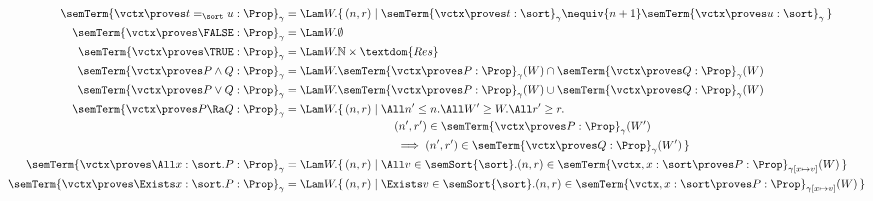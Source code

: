\begin{align*}
	\semTerm{\vctx \proves t =_\sort u : \Prop}_\gamma &=
	\Lam W. \{\, (n, r) \mid \semTerm{\vctx \proves t : \sort}_\gamma \nequiv{n+1} \semTerm{\vctx \proves u : \sort}_\gamma \,\} \\
	\semTerm{\vctx \proves \FALSE : \Prop}_\gamma &= \Lam W. \emptyset \\
	\semTerm{\vctx \proves \TRUE : \Prop}_\gamma &= \Lam W. \mathbb{N} \times \textdom{Res} \\
	\semTerm{\vctx \proves P \land Q : \Prop}_\gamma &=
	\Lam W. \semTerm{\vctx \proves P : \Prop}_\gamma(W) \cap \semTerm{\vctx \proves Q : \Prop}_\gamma(W) \\
	\semTerm{\vctx \proves P \lor Q : \Prop}_\gamma &=
	\Lam W. \semTerm{\vctx \proves P : \Prop}_\gamma(W) \cup \semTerm{\vctx \proves Q : \Prop}_\gamma(W) \\
	\semTerm{\vctx \proves P \Ra Q : \Prop}_\gamma &=
	\Lam W. \begin{aligned}[t]
		\{\, (n, r) &\mid \All n' \leq n. \All W' \geq W. \All r' \geq r. \\
		&\qquad
		(n', r') \in \semTerm{\vctx \proves P : \Prop}_\gamma(W')~ \\
		&\qquad 
		\implies (n', r') \in \semTerm{\vctx \proves Q : \Prop}_\gamma(W') \,\}
	\end{aligned} \\
	\semTerm{\vctx \proves \All x : \sort. P : \Prop}_\gamma &=
	\Lam W. \{\, (n, r) \mid \All v \in \semSort{\sort}. (n, r) \in \semTerm{\vctx, x : \sort \proves P : \Prop}_{\gamma[x \mapsto v]}(W) \,\} \\
	\semTerm{\vctx \proves \Exists x : \sort. P : \Prop}_\gamma &=
	\Lam W. \{\, (n, r) \mid \Exists v \in \semSort{\sort}. (n, r) \in \semTerm{\vctx, x : \sort \proves P : \Prop}_{\gamma[x \mapsto v]}(W) \,\}
\end{align*}
%
